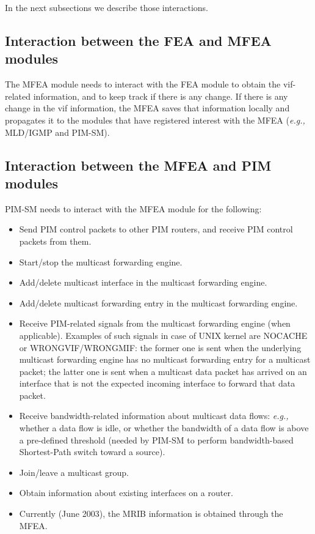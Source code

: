 \documentclass[11pt]{article}
\newcommand{\eg}{\emph{e.g.,}\xspace}
\begin{document}
In the next subsections we describe those interactions.

\subsection{Interaction between the FEA and MFEA modules}

The MFEA module needs to interact with the FEA module to obtain the
vif-related information, and to keep track if there is any change.
If there is any change in the vif information, the MFEA saves that
information locally and propagates it to the modules that have
registered interest with the MFEA (\eg MLD/IGMP and PIM-SM).

\subsection{Interaction between the MFEA and PIM modules}

PIM-SM needs to interact with the MFEA module for the following:

\begin{itemize}

  \item Send PIM control packets to other PIM routers, and receive PIM
  control packets from them.

  \item Start/stop the multicast forwarding engine.

  \item Add/delete multicast interface in the multicast forwarding
  engine.

  \item Add/delete multicast forwarding entry in the multicast
  forwarding engine.

  \item Receive PIM-related signals from the multicast forwarding engine
  (when applicable). Examples of such signals in case of UNIX kernel are
  NOCACHE or WRONGVIF/WRONGMIF: the former one is sent when the
  underlying multicast
  forwarding engine has no multicast forwarding entry for a multicast
  packet; the latter one is sent when a multicast data packet has
  arrived on an interface that is not the expected incoming interface to
  forward that data packet.

  \item Receive bandwidth-related information about multicast data
  flows: \eg whether a data flow is idle, or whether the bandwidth of a
  data flow is above a pre-defined threshold (needed by PIM-SM to perform
  bandwidth-based Shortest-Path switch toward a source).

  \item Join/leave a multicast group.

  \item Obtain information about existing interfaces on a router.

  \item Currently (June 2003), the MRIB information is
  obtained through the MFEA.

\end{itemize}
\end{document}
